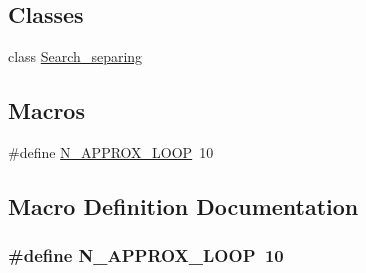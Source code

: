 \subsection*{Classes}
\begin{DoxyCompactItemize}
\item 
class \hyperlink{classSearch__separing}{Search\-\_\-separing}
\end{DoxyCompactItemize}
\subsection*{Macros}
\begin{DoxyCompactItemize}
\item 
\#define \hyperlink{search__separing_8hh_a8b665f91fa2c52261d83381232d5ee96}{N\-\_\-\-A\-P\-P\-R\-O\-X\-\_\-\-L\-O\-O\-P}~10
\end{DoxyCompactItemize}


\subsection{Macro Definition Documentation}
\hypertarget{search__separing_8hh_a8b665f91fa2c52261d83381232d5ee96}{
\subsubsection[{N\-\_\-\-A\-P\-P\-R\-O\-X\-\_\-\-L\-O\-O\-P}]{\setlength{\rightskip}{0pt plus 5cm}\#define N\-\_\-\-A\-P\-P\-R\-O\-X\-\_\-\-L\-O\-O\-P~10}}\label{search__separing_8hh_a8b665f91fa2c52261d83381232d5ee96}

